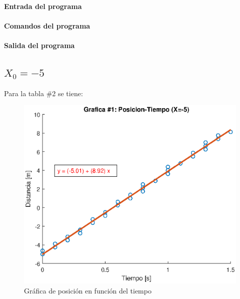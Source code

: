 \documentclass[letter,11pt]{article}
\begin{document}
\paragraph{Entrada del programa}
\begin{alltt}
\footnotesize

\normalsize
\end{alltt}

\paragraph{Comandos del programa}
\begin{alltt}
\footnotesize

\normalsize
\end{alltt}

\paragraph{Salida del programa}
\begin{alltt}
\footnotesize

\normalsize
\end{alltt}

\subsection{$X_0 = -5$}
Para la tabla \#2 se tiene:

\begin{figure}[!h]
\centering
\includegraphics[scale=1.00]{eps/5.2.eps}
\caption{Gráfica de posición en función del tiempo}
\label{practica52}
\end{figure}
\end{document}
